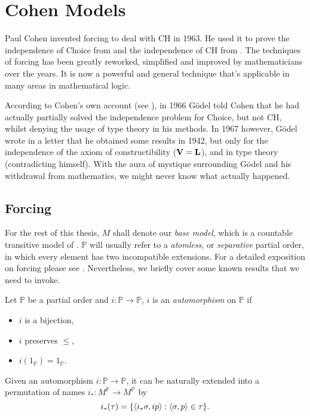 \chapter{Cohen Models}

Paul Cohen invented forcing to deal with CH in 1963.
He used it to prove the independence of Choice from \ZF and the independence of CH from \ZFC.
The techniques of forcing has been greatly reworked, simplified and improved by mathematicians over the years.
It is now a powerful and general technique that's applicable in many areas in mathematical logic.

According to Cohen's own account (see \autocite[1087]{cohen2002}),
in 1966 Gödel told Cohen that he had actually partially solved the independence problem for Choice, but not CH,
whilst denying the usage of type theory in his methods.
In 1967 however, Gödel wrote in a letter that he obtained some results in 1942,
but only for the independence of the axiom of constructibility (\(\mathbf{V} = \mathbf{L}\)), and in type theory (contradicting himself).
With the aura of mystique surrounding Gödel and his withdrawal from mathematics, we might never know what actually happened.

\section{Forcing}
\renewcommand*{\P}{{\mathbb{P}}}
\newcommand*{\forces}{\Vdash}

For the rest of this thesis, \(M\) shall denote our \emph{base model}, which is a countable transitive model of \ZFC.
\(\P\) will usually refer to a \emph{atomless}, or \emph{separative} partial order, in which every element has two incompatible extensions.
For a detailed exposition on forcing please see \autocite{kunen1980}.
Nevertheless, we briefly cover some known results that we need to invoke.

\begin{definition}
    Let \(\P\) be a partial order and \(i: \P\to\P\),
    \(i\) is an \emph{automorphism} on \(\P\) if
    \begin{itemize}
        \item \(i\) is a bijection,
        \item \(i\) preserves \(\leq\),
        \item \(i(1_{\P}) = 1_\P\).
    \end{itemize}
\end{definition}

\begin{definition} \label{defn:extend_automorphism_to_names}
    Given an automorphism \(i:\P\to\P\),
    it can be naturally extended into a permutation of names \(i_*: M^{\mathbb{P}} \to M^{\mathbb{P}}\) by
    \[ i_*(\tau) = {\left\{ \left\langle i_* \sigma , i p \right\rangle: \left\langle\sigma,p\right\rangle\in \tau \right\}}. \]
\end{definition}

